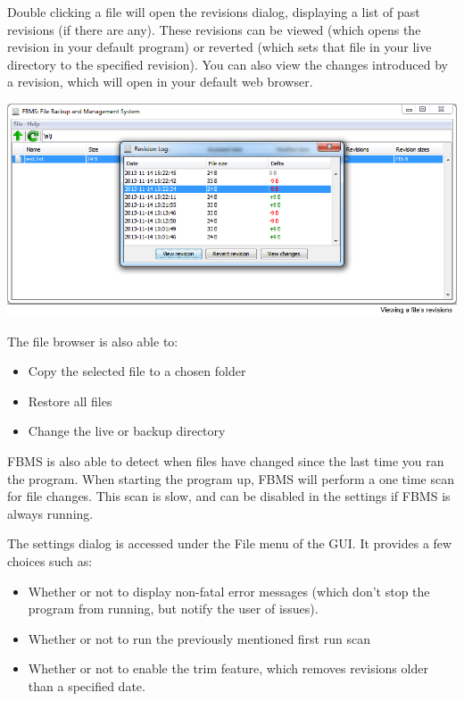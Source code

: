 \documentclass[12pt,a4paper]{article}
\begin{document}
Double clicking a file will open the revisions dialog, displaying a list of past revisions (if there are any). These revisions can be viewed (which opens the revision in your default program) or reverted (which sets that file in your live directory to the specified revision). You can also view the changes introduced by a revision, which will open in your default web browser.

\includegraphics[width=\textwidth]{images/6-revisionDialog.png}

The file browser is also able to:

\begin{itemize}
\item Copy the selected file to a chosen folder
\item Restore all files
\item Change the live or backup directory
\end{itemize}

FBMS is also able to detect when files have changed since the last time you ran the program. When starting the program up, FBMS will perform a one time scan for file changes. This scan is slow, and can be disabled in the settings if FBMS is always running.

The settings dialog is accessed under the File menu of the GUI. It provides a few choices such as:

\begin{itemize}
\item Whether or not to display non-fatal error messages (which don't stop the program from running, but notify the user of issues).
\item Whether or not to run the previously mentioned first run scan
\item Whether or not to enable the trim feature, which removes revisions older than a specified date.
\end{itemize}
\end{document}
